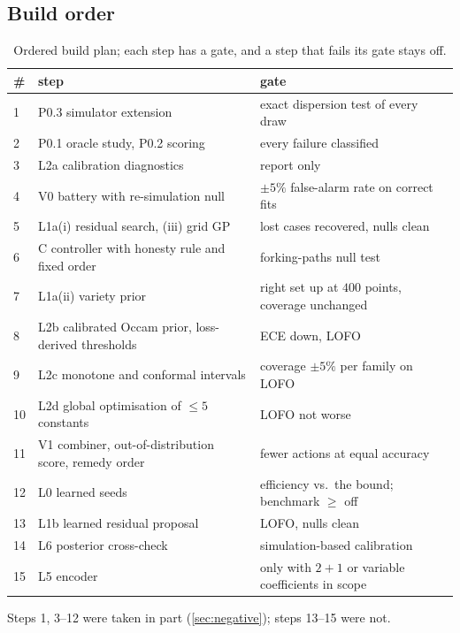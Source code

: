 \subsection{Build order}
\begin{table}[tbp]
\centering\small
\caption{Ordered build plan; each step has a gate, and a step that fails its gate stays off.}\label{tab:order}
\begin{tabular}{@{}p{0.5cm}p{6.7cm}p{4.6cm}@{}}
\toprule
\# & step & gate\\
\midrule
1 & P0.3 simulator extension & exact dispersion test of every draw\\
2 & P0.1 oracle study, P0.2 scoring & every failure classified\\
3 & L2a calibration diagnostics & report only\\
4 & V0 battery with re-simulation null & $\pm5\%$ false-alarm rate on correct fits\\
5 & L1a(i) residual search, (iii) grid GP & lost cases recovered, nulls clean\\
6 & C controller with honesty rule and fixed order & forking-paths null test\\
7 & L1a(ii) variety prior & right set up at $400$ points, coverage unchanged\\
8 & L2b calibrated Occam prior, loss-derived thresholds & ECE down, LOFO\\
9 & L2c monotone and conformal intervals & coverage $\pm5\%$ per family on LOFO\\
10 & L2d global optimisation of $\le5$ constants & LOFO not worse\\
11 & V1 combiner, out-of-distribution score, remedy order & fewer actions at equal accuracy\\
12 & L0 learned seeds & efficiency vs.\ the bound; benchmark $\ge$ off\\
13 & L1b learned residual proposal & LOFO, nulls clean\\
14 & L6 posterior cross-check & simulation-based calibration\\
15 & L5 encoder & only with $2{+}1$ or variable coefficients in scope\\
\bottomrule
\end{tabular}
\end{table}
Steps 1, 3--12 were taken in part (\cref{sec:negative}); steps 13--15 were not.
